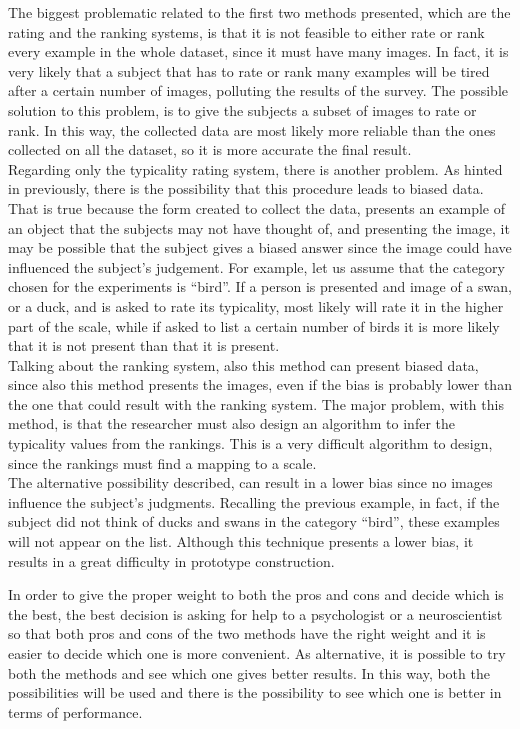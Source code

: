 \documentclass[conference]{IEEEtran}
\begin{document}
				\noindent The biggest problematic related to the first two methods presented, which are the rating and the ranking systems, is that it is not feasible to either rate or rank every example in the whole 
				dataset, since it must have many images. In fact, it is very likely that a subject that has to rate or rank many examples will be tired after a certain number of images, polluting the results of the survey.
				The possible solution to this problem, is to give the subjects a subset of images to rate or rank. In this way, the collected data are most likely more reliable than the ones collected on all the dataset, 
				so it is more accurate the final result. \\
				Regarding only the typicality rating system, there is another problem. As hinted in previously, there is the possibility that this procedure leads to biased data. That is true because the form 
				created to collect the data, presents an example of an object that the subjects may not have thought of, and presenting the image, it may be possible that the subject gives a biased answer since 
				the image could have influenced the subject's judgement. For example, let us assume that the category chosen for the experiments is ``bird''. If a person is presented and image of a swan, 
				or a duck, and is asked to rate its typicality, most likely will rate it in the higher part of the scale, while if asked to list a certain number of birds it is more likely that it is not 
				present than that it is present.\\
				Talking about the ranking system, also this method can present biased data, since also this method presents the images, even if the bias is probably lower than the one that could result with the ranking system. 
				The major problem, with this method, is that the researcher must also design an algorithm to infer the typicality values from the rankings. This is a very difficult algorithm to design, since the rankings must 
				find a mapping to a scale.\\
				The alternative possibility described, can result in a lower bias since no images influence the subject's judgments. Recalling the previous example, in fact, if the subject did not think of 
				ducks and swans in the category ``bird'', these examples will not appear on the list. Although this technique presents a lower bias, it results in a great difficulty in prototype construction.
				\vspace{12pt}
				
				\noindent In order to give the proper weight to both the pros and cons and decide which is the best, the best decision is asking for help to a psychologist or a neuroscientist so that both pros and cons of the two 
				methods have the right weight and it is easier to decide which one is more convenient.
				As alternative, it is possible to try both the methods and see which one gives better results. In this way, both the possibilities will be used and there is the possibility to see which one is better in 
				terms of performance. 
			
\end{document}
